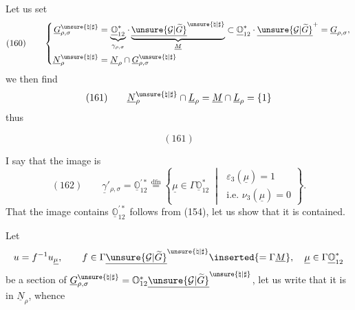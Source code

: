 Let us set
\[
(160)\qquad\left\{
\begin{aligned}
\underline G_{\rho,\sigma}^{\unsure{\natural|\sharp}}
&=\underbrace{\underline{\mathbb O}_{12}^{*}}_{\gamma_{\rho,\sigma}}\cdot
\underbrace{\underline{\unsure{\mathcal G|\widetilde G}}^{\unsure{\natural|\sharp}}}_{\underline M}
\subset\underline{\mathbb O}_{12}^{*}\cdot\underline{\unsure{\mathcal G|\widetilde G}}^{+}
=\underline G_{\rho,\sigma},\\
\underline N_\rho^{\unsure{\natural|\sharp}}
&=\underline N_\rho\cap\underline G_{\rho,\sigma}^{\unsure{\natural|\sharp}}
\end{aligned}\right.
\]
we then find
\[
(161)\qquad
\underline N_\rho^{\unsure{\natural|\sharp}}\cap\underline L_\rho
=\underline M\cap\underline L_\rho=\{1\}
\]
thus
\begin{samepage}
\[
(161)
\]
\end{samepage}
I say that the image is
\[
(162)\qquad
\underline\gamma'_{\rho,\sigma}
=\underline{\mathbb O}_{12}^{\prime *}
\overset{\mathrm{dfn}}{=}
\left\{\underline\mu\in\Gamma\underline{\mathbb O}_{12}^{*}\;\middle|\;
\begin{gathered}\varepsilon_3(\underline\mu)=1\\\text{i.e. }\nu_3(\underline\mu)=0\end{gathered}\right\}.
\]
That the image contains $\underline{\mathbb O}_{12}^{\prime *}$ follows from (154), let us show that it is contained.

Let
\[
u=f^{-1}u_{\underline\mu},\qquad
f\in\Gamma\underline{\unsure{\mathcal G|\widetilde G}}^{\unsure{\natural|\sharp}}\inserted{=\Gamma\underline M},\quad
\underline\mu\in\Gamma\underline{\mathbb O}_{12}^{*}
\]
be a  section of
$\underline G_{\rho,\sigma}^{\unsure{\natural|\sharp}}
=\mathbb O_{12}^{*}\underline{\unsure{\mathcal G|\widetilde G}}^{\unsure{\natural|\sharp}}$,
let us write that it is in $\underline N_\rho$, whence


